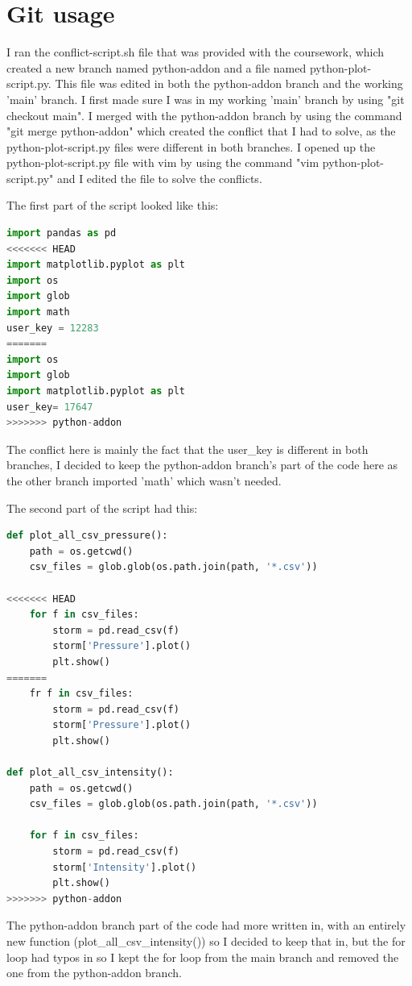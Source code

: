 \documentclass[]{article}
\begin{document}
\section{Git usage}
I ran the conflict-script.sh file that was provided with the coursework, which created a new branch named python-addon and a file named python-plot-script.py. This file was edited in both the python-addon branch and the working 'main' branch.
I first made sure I was in my working 'main' branch by using "git checkout main".
I merged with the python-addon branch by using the command "git merge python-addon" which created the conflict that I had to solve, as the python-plot-script.py files were different in both branches.
I opened up the python-plot-script.py file with vim by using the command "vim python-plot-script.py" and I edited the file to solve the conflicts.

The first part of the script looked like this:
\begin{lstlisting}[language=python]
import pandas as pd
<<<<<<< HEAD
import matplotlib.pyplot as plt
import os
import glob
import math
user_key = 12283
=======
import os
import glob
import matplotlib.pyplot as plt
user_key= 17647
>>>>>>> python-addon  
\end{lstlisting}
The conflict here is mainly the fact that the user\_key is different in both branches, I decided to keep the python-addon branch's part of the code here as the other branch imported 'math' which wasn't needed.

The second part of the script had this:
\begin{lstlisting}[language=python]
def plot_all_csv_pressure():
    path = os.getcwd()
    csv_files = glob.glob(os.path.join(path, '*.csv'))

<<<<<<< HEAD
    for f in csv_files:
        storm = pd.read_csv(f)
        storm['Pressure'].plot()
        plt.show()
=======
    fr f in csv_files:
        storm = pd.read_csv(f)
        storm['Pressure'].plot()
        plt.show()

def plot_all_csv_intensity():
    path = os.getcwd()
    csv_files = glob.glob(os.path.join(path, '*.csv'))

    for f in csv_files:
        storm = pd.read_csv(f)
        storm['Intensity'].plot()
        plt.show()
>>>>>>> python-addon
\end{lstlisting}
The python-addon branch part of the code had more written in, with an entirely new function (plot\_all\_csv\_intensity()) so I decided to keep that in, but the for loop had typos in so I kept the for loop from the main branch and removed the one from the python-addon branch.
\end{document}
